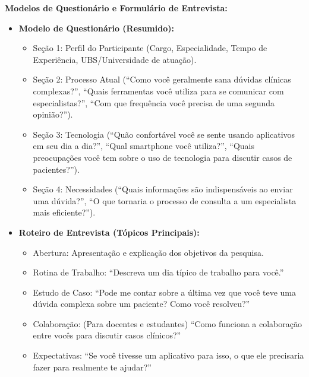\documentclass[12pt, a4paper, oneside]{abntex2}
\begin{document}
\textbf{Modelos de Questionário e Formulário de Entrevista:}
\begin{itemize}
    \item \textbf{Modelo de Questionário (Resumido):}
    \begin{itemize}
        \item Seção 1: Perfil do Participante (Cargo, Especialidade, Tempo de Experiência, UBS/Universidade de atuação).
        \item Seção 2: Processo Atual (``Como você geralmente sana dúvidas clínicas complexas?'', ``Quais ferramentas você utiliza para se comunicar com especialistas?'', ``Com que frequência você precisa de uma segunda opinião?'').
        \item Seção 3: Tecnologia (``Quão confortável você se sente usando aplicativos em seu dia a dia?'', ``Qual smartphone você utiliza?'', ``Quais preocupações você tem sobre o uso de tecnologia para discutir casos de pacientes?'').
        \item Seção 4: Necessidades (``Quais informações são indispensáveis ao enviar uma dúvida?'', ``O que tornaria o processo de consulta a um especialista mais eficiente?'').
    \end{itemize}
    \item \textbf{Roteiro de Entrevista (Tópicos Principais):}
    \begin{itemize}
        \item Abertura: Apresentação e explicação dos objetivos da pesquisa.
        \item Rotina de Trabalho: ``Descreva um dia típico de trabalho para você.''
        \item Estudo de Caso: ``Pode me contar sobre a última vez que você teve uma dúvida complexa sobre um paciente? Como você resolveu?''
        \item Colaboração: (Para docentes e estudantes) ``Como funciona a colaboração entre vocês para discutir casos clínicos?''
        \item Expectativas: ``Se você tivesse um aplicativo para isso, o que ele precisaria fazer para realmente te ajudar?''
    \end{itemize}
\end{itemize}
\end{document}
